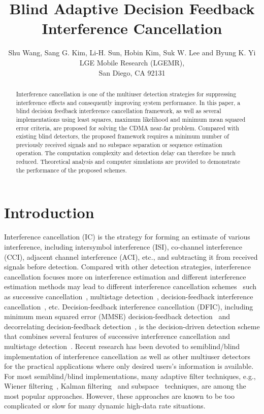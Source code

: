 \documentclass[a4paper,10pt,fleqn, twocolumn]{IEEETran}
\title{Blind Adaptive Decision Feedback Interference Cancellation}
\author{Shu Wang, Sang G. Kim, Li-H. Sun, Hobin Kim, Suk W. Lee and Byung K. Yi\\ LGE Mobile Research (LGEMR),\\ San Diego, CA 92131}
\date{}
\begin{document}
\maketitle
\begin{abstract}\small
Interference cancellation is one of the multiuser detection
strategies for suppressing interference effects and consequently
improving system performance. In this paper, a blind decision
feedback interference cancellation framework, as well as several
implementations using least squares, maximum likelihood and
minimum mean squared error criteria, are proposed for solving the
CDMA near-far problem. Compared with existing blind detectors, the
proposed framework requires a minimum number of previously
received signals and no subspace separation or sequence estimation
operation. The computation complexity and detection delay can
therefore be much reduced. Theoretical analysis and computer
simulations are provided to demonstrate the performance of the
proposed schemes.
\end{abstract}
\section{Introduction}
Interference cancellation (IC) is the strategy for forming an
estimate of various interference, including intersymbol
interference (ISI), co-channel interference (CCI), adjacent
channel interference (ACI), etc., and subtracting it from received
signals before detection. Compared with other detection
strategies, interference cancellation focuses more on interference
estimation and different interference estimation methods may lead
to different interference cancellation
schemes~\cite{Yoon93B,Verd98,Wang02b} such as successive
cancellation~\cite{Kohno91}, multistage detection~\cite{Vara88},
decision-feedback interference
cancellation~\cite{Kave85,Duel93,Duel95}, etc. Decision-feedback
interference cancellation (DFIC), including minimum mean squared
error (MMSE) decision-feedback detection~\cite{Kave85} and
decorrelating decision-feedback detection~\cite{Duel93,Duel95}, is
the decision-driven detection scheme that combines several
features of successive interference cancellation and multistage
detection~\cite{Verd98}. Recent research has been devoted to
semiblind/blind implementation of interference cancellation as
well as other multiuser
detectors~\cite{Madh94,Madh98,Wang98,Zhang02} for the practical
applications where only desired users's information is available.
For most semiblind/blind implementations, many adaptive filter
techniques, e.g., Wiener filtering~\cite{Madh94}, Kalman
filtering~\cite{Zhang02} and subspace~\cite{Wang98} techniques,
are among the most popular approaches. However, these approaches
are known to be too complicated or slow for many dynamic high-data
rate situations.
\end{document}
